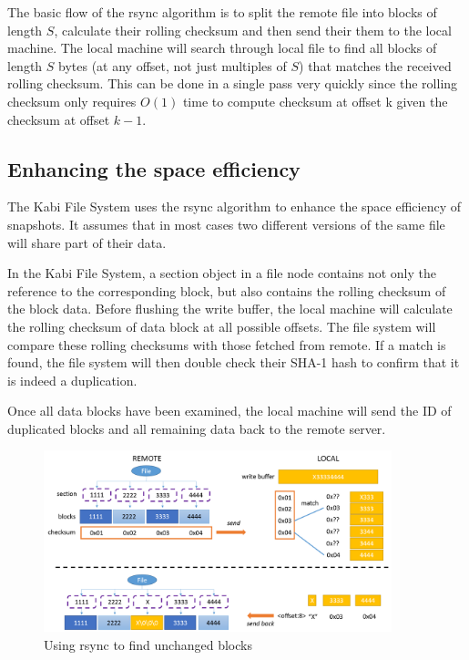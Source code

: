     The basic flow of the rsync algorithm is to split the remote file into blocks of length $S$, calculate their rolling checksum and then send their them to the local machine. The local machine will search through local file to find all blocks of length $S$ bytes (at any offset, not just multiples of $S$) that matches the received rolling checksum. This can be done in a single pass very quickly since the rolling checksum only requires $O(1)$ time to compute checksum at offset k given the checksum at offset $k-1$.

\subsection{Enhancing the space efficiency}

    The Kabi File System uses the rsync algorithm to enhance the space efficiency of snapshots. It assumes that in most cases two different versions of the same file will share part of their data.

    In the Kabi File System, a section object in a file node contains not only the reference to the corresponding block, but also contains the rolling checksum of the block data. Before flushing the write buffer, the local machine will calculate the rolling checksum of data block at all possible offsets. The file system will compare these rolling checksums with those fetched from remote. If a match is found, the file system will then double check their SHA-1 hash to confirm that it is indeed a duplication.
    
    Once all data blocks have been examined, the local machine will send the ID of duplicated blocks and all remaining data back to the remote server.


\begin{figure}[hbtp]
\centering
\includegraphics[width=0.9\textwidth]{Chapter-4/figs/fig25.png}
\caption{Using rsync to find unchanged blocks}
\label{fig:rsync}
\end{figure}

